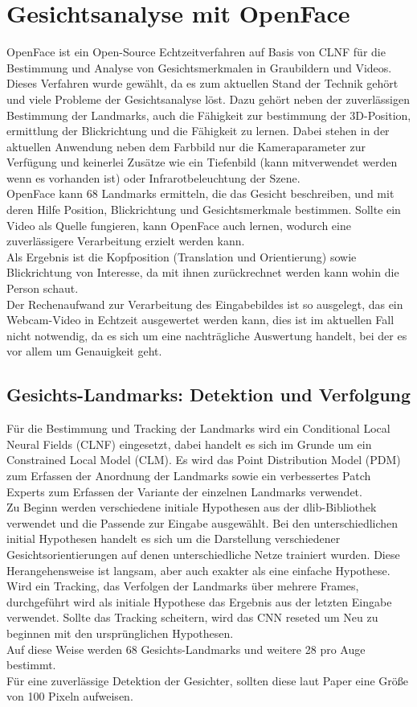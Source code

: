 \section{Gesichtsanalyse mit OpenFace}
\label{OpenFace}
OpenFace ist ein Open-Source Echtzeitverfahren auf Basis von CLNF für die Bestimmung und Analyse von Gesichtsmerkmalen in Graubildern und Videos. Dieses Verfahren wurde gewählt, da es zum aktuellen Stand der Technik gehört und viele Probleme der Gesichtsanalyse löst. Dazu gehört neben der zuverlässigen Bestimmung der Landmarks, auch die Fähigkeit zur bestimmung der 3D-Position, ermittlung der Blickrichtung und die Fähigkeit zu lernen. Dabei stehen in der aktuellen Anwendung neben dem Farbbild nur die Kameraparameter zur Verfügung und keinerlei Zusätze wie ein Tiefenbild (kann mitverwendet werden wenn es vorhanden ist) oder Infrarotbeleuchtung der Szene.\\
OpenFace kann 68 Landmarks ermitteln, die das Gesicht beschreiben, und mit deren Hilfe Position, Blickrichtung und Gesichtsmerkmale bestimmen. Sollte ein Video als Quelle fungieren, kann OpenFace auch lernen, wodurch eine zuverlässigere Verarbeitung erzielt werden kann.\\
Als Ergebnis ist die Kopfposition (Translation und Orientierung) sowie Blickrichtung von Interesse, da mit ihnen zurückrechnet werden kann wohin die Person schaut.\\
Der Rechenaufwand zur Verarbeitung des Eingabebildes ist so ausgelegt, das ein Webcam-Video in Echtzeit ausgewertet werden kann, dies ist im aktuellen Fall nicht notwendig, da es sich um eine nachträgliche Auswertung handelt, bei der es vor allem um Genauigkeit geht.
\subsection{Gesichts-Landmarks: Detektion und Verfolgung}
Für die Bestimmung und Tracking der Landmarks wird ein Conditional Local Neural Fields (CLNF) eingesetzt, dabei handelt es sich im Grunde um ein Constrained Local Model (CLM). Es wird das Point Distribution Model (PDM) zum Erfassen der Anordnung der Landmarks sowie ein verbessertes Patch Experts zum Erfassen der Variante der einzelnen Landmarks verwendet.\\
Zu Beginn werden verschiedene initiale Hypothesen aus der dlib-Bibliothek verwendet und die Passende zur Eingabe ausgewählt. Bei den unterschiedlichen initial Hypothesen handelt es sich um die Darstellung verschiedener Gesichtsorientierungen auf denen unterschiedliche Netze trainiert wurden. Diese Herangehensweise ist langsam, aber auch exakter als eine einfache Hypothese. Wird ein Tracking, das Verfolgen der Landmarks über mehrere Frames, durchgeführt wird als initiale Hypothese das Ergebnis aus der letzten Eingabe verwendet. Sollte das Tracking scheitern, wird das CNN reseted um Neu zu beginnen mit den ursprünglichen Hypothesen.\\
Auf diese Weise werden 68 Gesichts-Landmarks und weitere 28 pro Auge bestimmt.\\
Für eine zuverlässige Detektion der Gesichter, sollten diese laut Paper \cite{OpenFace} eine Größe von 100 Pixeln aufweisen.
